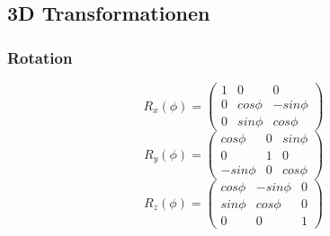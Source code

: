 \subsection{3D Transformationen}

\subsubsection{Rotation}
\[R_x(\phi) = \begin{pmatrix} 1 & 0 & 0 \\ 0 & cos\phi & -sin\phi \\ 0 & sin\phi & cos\phi \end{pmatrix}\]
\[R_y(\phi) = \begin{pmatrix} cos\phi & 0 & sin\phi \\ 0 & 1 & 0 \\ -sin\phi & 0 & cos\phi \end{pmatrix}\]
\[R_z(\phi) = \begin{pmatrix} cos\phi & -sin\phi & 0 \\ sin\phi & cos\phi & 0 \\ 0 & 0 & 1 \end{pmatrix}\]
